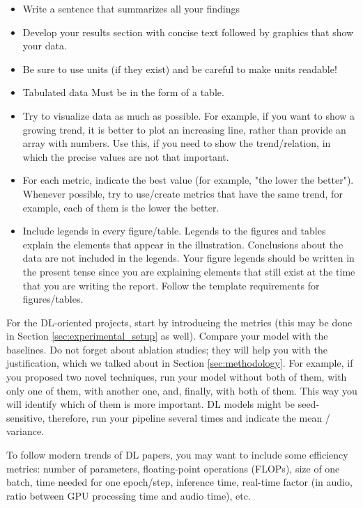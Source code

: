 \documentclass[10pt,conference,compsocconf]{IEEEtran}
\begin{document}
\begin{itemize}
	\item Write a sentence that summarizes all your findings
	\item Develop your results section with concise text followed by graphics that show your data.
	\item Be sure to use units (if they exist) and be careful to make units readable!
	\item Tabulated data Must be in the form of a table.
	\item Try to visualize data as much as possible. For example, if you want to show a growing trend, it is better to plot an increasing line, rather than provide an array with numbers. Use this, if you need to show the trend/relation, in which the precise values are not that important.
	\item For each metric, indicate the best value (for example, "the lower the better"). Whenever possible, try to use/create metrics that have the same trend, for example, each of them is the lower the better.
	\item Include legends in every figure/table. Legends to the figures and tables explain the elements that appear in the illustration. Conclusions about the data are not included in the legends. Your figure legends should be written in the present tense since you are explaining elements that still exist at the time that you are writing the report. Follow the template requirements for figures/tables.
\end{itemize}

For the DL-oriented projects, start by introducing the metrics (this may be done in Section \ref{sec:experimental_setup} as well). Compare your model with the baselines. Do not forget about ablation studies; they will help you with the justification, which we talked about in Section \ref{sec:methodology}. For example, if you proposed two novel techniques, run your model without both of them, with only one of them, with another one, and, finally, with both of them. This way you will identify which of them is more important. DL models might be seed-sensitive, therefore, run your pipeline several times and indicate the mean / variance.

To follow modern trends of DL papers, you may want to include some efficiency metrics: number of parameters, floating-point operations (FLOPs), size of one batch, time needed for one epoch/step, inference time, real-time factor (in audio, ratio between GPU processing time and audio time), etc. 
\end{document}
